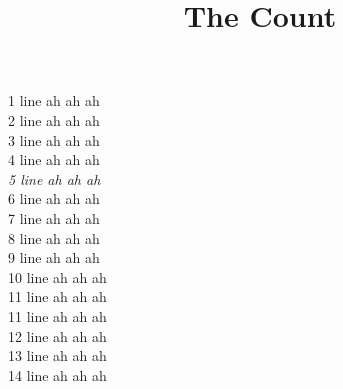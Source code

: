 \documentclass{ximera}
\title{The Count}
\begin{document}
1 line ah ah ah \\
2 line ah ah ah \\
3 line ah ah ah \\
4 line ah ah ah \\
\emph{5 line ah ah ah} \\
6 line ah ah ah \\
\large{7 line ah ah ah} \\
8 line ah ah ah \\
\tiny{9 line ah ah ah} \\
10 line ah ah ah \\
\footnotesize{11 line ah ah ah} \\
11 line ah ah ah \\
\huge{12 line ah ah ah} \\
13 line ah ah ah \\
14 line ah ah ah \\
\end{document}
